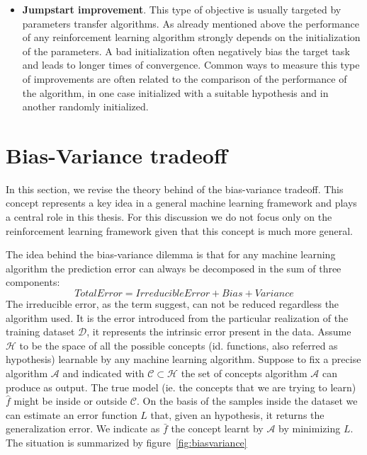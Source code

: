 \begin{itemize}
        \item \textbf{Jumpstart improvement}. This type of objective is usually targeted by parameters transfer
        algorithms. As already mentioned above the performance of any reinforcement learning algorithm strongly
        depends on the initialization of the parameters. A bad initialization often negatively bias the target task
        and leads to longer times of convergence. Common ways to measure this type of improvements are often related
        to the comparison of the performance of the algorithm, in one case initialized with a suitable hypothesis and
        in another randomly initialized.
      \end{itemize}

      \section{Bias-Variance tradeoff}
      	\noindent In this section, we revise the theory behind of the bias-variance tradeoff. This concept represents a key idea in a
      	general machine learning framework and plays a central role in this thesis.
      	For this discussion we do not focus only on the reinforcement learning framework given that this concept is much more general.\newline

      	\noindent The idea behind the bias-variance dilemma is that for any machine learning algorithm the prediction error can
      	always be decomposed in the sum of three components:
      	\begin{equation*}
      		Total Error = Irreducible Error + Bias + Variance
      	\end{equation*}
      	The irreducible error, as the term suggest, can not be reduced regardless the algorithm used. It is the error
      	introduced from the particular realization of the training dataset $\mathcal{D}$, it represents the intrinsic error present in the data.\newline
      	Assume $\mathcal{H}$ to be the space of all the possible concepts (id. functions, also referred as hypothesis) learnable by any machine learning algorithm.
      	Suppose to fix a precise algorithm $\mathcal{A}$ and indicated with $\mathcal{C} \subset \mathcal{H}$ the set of concepts algorithm $\mathcal{A}$ can produce
      	as output. The true model (ie. the concepts that we are trying to learn) $\hat{f}$ might be inside or outside $\mathcal{C}$. On the basis of the samples
      	inside the dataset we can estimate an error function $L$ that, given an hypothesis, it returns the generalization error. We indicate as $\bar{f}$ the
      	concept learnt by $\mathcal{A}$ by minimizing $L$.\newline
      	The situation is summarized by figure~\ref{fig:biasvariance}\newline

